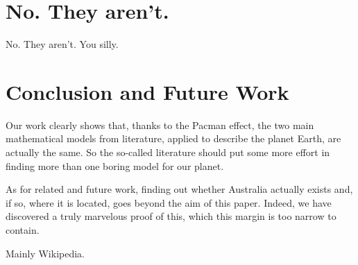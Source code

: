 \documentclass{article}
\begin{document}
\section{No. They aren't.}
No. They aren't. You silly.
\section{Conclusion and Future Work}
Our work clearly shows that, thanks to the Pacman effect, the two main mathematical models from literature, applied to describe the planet Earth, are actually the same. So the so-called literature should put some more effort in finding more than one boring model for our planet.

As for related and future work, finding out whether Australia actually exists and, if so, where it is located, goes beyond the aim of this paper. Indeed, we have discovered a truly marvelous proof of this, which this margin is too narrow to contain.

\begin{thebibliography}{1}

  Mainly Wikipedia.

\end{thebibliography}
\end{document}

